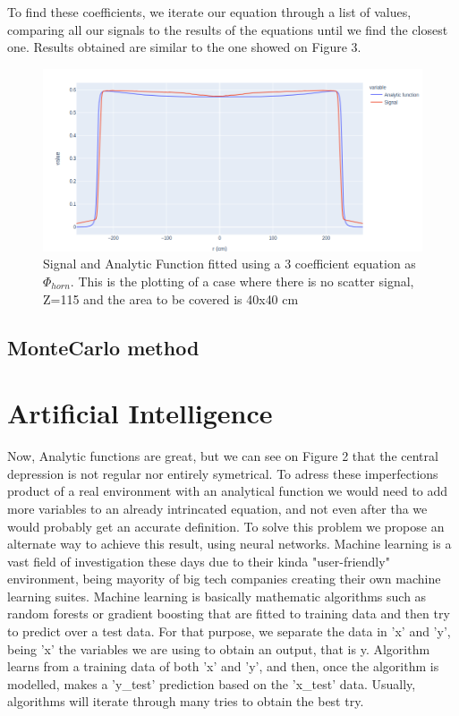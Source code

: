 \documentclass[openany]{article}
\begin{document}
To find these coefficients, we iterate our equation through a list of values, comparing all our signals to the results of the equations until we find the closest one. Results obtained are similar to the one showed on Figure 3. 

\begin{figure}[!h]
    \centering
    \includegraphics[width=15cm]{Limit400Z115.png}
    \caption{Signal and Analytic Function fitted using a 3 coefficient equation as \(\Phi_{horn}\). This is the plotting of a case where there is no scatter signal, Z=115 and the area to be covered is 40x40 cm}
    \label{fig:my_label}
\end{figure}


\subsection{MonteCarlo method}







\newpage

\section{Artificial Intelligence}


Now, Analytic functions are great, but we can see on Figure 2 that the central depression is not regular nor entirely symetrical. To adress these imperfections product of a real environment with an analytical function we would need to add more variables to an already intrincated equation, and not even after tha we would probably get an accurate definition. To solve this problem we propose an alternate way to achieve this result, using neural networks. Machine learning is a vast field of investigation these days due to their kinda "user-friendly" environment, being mayority of big tech companies creating their own machine learning suites. Machine learning is basically mathematic algorithms such as random forests or gradient boosting that are fitted to training data and then try to predict over a test data. For that purpose, we separate the data in 'x' and 'y', being 'x' the variables we are using to obtain an output, that is y. Algorithm learns from a training data of both 'x' and 'y', and then, once the algorithm is modelled, makes a 'y\_test' prediction based on the 'x\_test' data. Usually, algorithms will iterate through many tries to obtain the best try.
\end{document}
